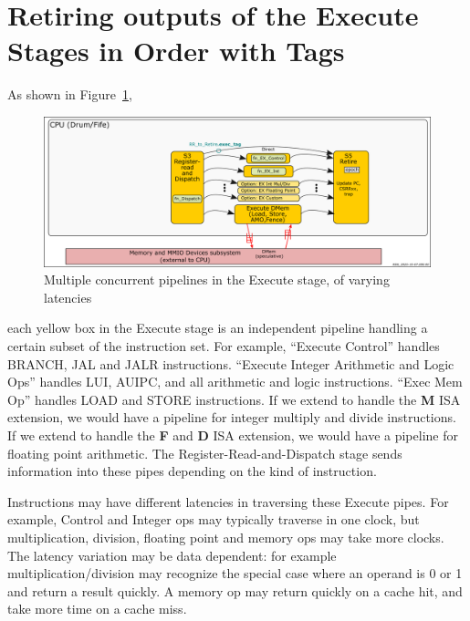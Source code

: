
\section{Retiring outputs of the Execute Stages in Order with Tags}

\label{Sec_Reorder_Tags}


As shown in Figure~\ref{Fig_RISCV_Retire_Ordering},
\begin{figure}[htbp]
  \centerline{\includegraphics[width=\textwidth]
      {Figures/RSN_2025-10-07.001.00_Concurrent_Exec_Pipes}}
  \caption{\label{Fig_RISCV_Retire_Ordering}
           Multiple concurrent pipelines in the Execute stage, of varying latencies}
\end{figure}
each yellow box in the Execute stage is an independent pipeline
handling a certain subset of the instruction set.  For example,
``Execute Control'' handles BRANCH, JAL and JALR
instructions. ``Execute Integer Arithmetic and Logic Ops'' handles
LUI, AUIPC, and all arithmetic and logic instructions.  ``Exec Mem
Op'' handles LOAD and STORE instructions.  If we extend {\FIFE} to
handle the {\bf M} ISA extension, we would have a pipeline for integer
multiply and divide instructions.  If we extend {\FIFE} to handle the
{\bf F} and {\bf D} ISA extension, we would have a pipeline for
floating point arithmetic.  The Register-Read-and-Dispatch stage sends
information into these pipes depending on the kind of instruction.

Instructions may have different latencies in traversing these Execute
pipes.  For example, Control and Integer ops may typically traverse in
one clock, but multiplication, division, floating point and memory ops
may take more clocks.  The latency variation may be data dependent:
for example multiplication/division may recognize the special case
where an operand is 0 or 1 and return a result quickly.  A memory op
may return quickly on a cache hit, and take more time on a cache miss.

